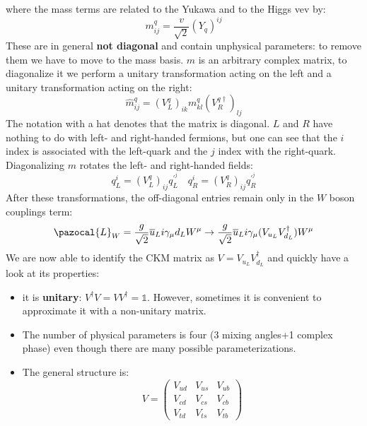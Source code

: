 \documentclass[../main.tex]{subfiles}
\begin{document}
where the mass terms are related to the Yukawa and to the Higgs vev by:
\[
m_{ij}^q=\frac{v}{\sqrt{2}}(Y_q)^{ij}
\]
These are in general \textbf{not diagonal} and contain unphysical parameters: to remove them we have to move to the mass basis. $m$ is an arbitrary complex matrix, to diagonalize it we perform a unitary transformation acting on the left and a unitary transformation acting on the right:
\[
\hat{m}_{ij}^q=(V_L^q)_{ik}m_{kl}^q(V_R^{q\dagger})_{lj}
\]
The notation with a hat denotes that the matrix is diagonal. $L$ and $R$ have nothing to do with left- and right-handed fermions, but one can see that the $i$ index is associated with the left-quark and the $j$ index with the right-quark. Diagonalizing $m$ rotates the left- and right-handed fields:
\[
q_L^i=(V_L^q)_{ij}q_L^{'^j} \quad q_R^i=(V_R^q)_{ij}q_R^{'^j}
\]
After these transformations, the off-diagonal entries remain only in the $W$ boson couplings term:
\[
\pazocal{L}_W=\frac{g}{\sqrt{2}}\overline{u}_Li\gamma_\mu d_LW^\mu\to\frac{g}{\sqrt{2}}\overline{u}_Li\gamma_\mu(V_{u_L}V_{d_L}^\dagger)W^\mu
\]
We are now able to identify the CKM matrix as $V=V_{u_L}V_{d_L}^\dagger$ and quickly have a look at its properties:
\begin{itemize}
    \item it is \textbf{unitary}: $V^\dagger V=VV^\dagger=\mathbb{1}$. However, sometimes it is convenient to approximate it with a non-unitary matrix.
    \item The number of physical parameters is four (3 mixing angles+1 complex phase) even though there are many possible parameterizations.
    \item The general structure is:
    \[
    V=\left(\begin{array}{ccc}
    V_{ud} & V_{us} & V_{ub} \\
    V_{cd} & V_{cs} & V_{cb} \\
    V_{td} & V_{ts} & V_{tb}
\end{array}\right)
    \]
\end{itemize}
\end{document}
